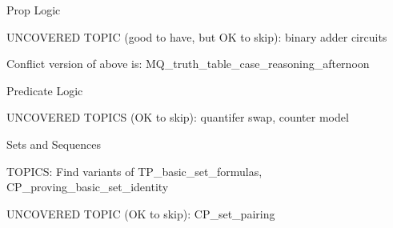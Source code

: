 \documentclass[quiz]{mcs}
\begin{document}
\examspace

\begin{center}
{\large Prop Logic}
\end{center}

UNCOVERED TOPIC (good to have, but OK to skip): binary adder circuits



Conflict version of above is: MQ\_truth\_table\_case\_reasoning\_afternoon

\examspace

\begin{center}
{\large Predicate Logic}
\end{center}

UNCOVERED TOPICS (OK to skip): quantifer swap, counter model




\begin{center}
{\large Sets and Sequences}
\end{center}

TOPICS: Find variants of TP\_basic\_set\_formulas,
CP\_proving\_basic\_set\_identity

UNCOVERED TOPIC (OK to skip): CP\_set\_pairing

\end{document}
